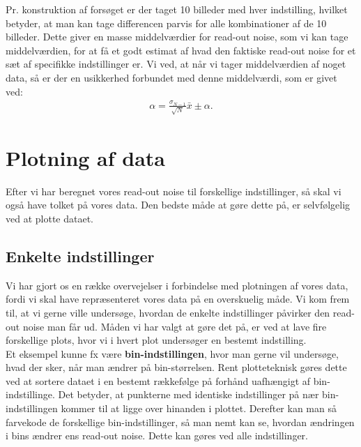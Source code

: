 \documentclass[working]{tuftebook}
\begin{document}
Pr. konstruktion af forsøget er der taget 10 billeder med hver indstilling, hvilket betyder, at man kan tage differencen parvis for alle kombinationer af de 10 billeder. Dette giver en masse middelværdier for read-out noise, som vi kan tage middelværdien, for at få et godt estimat af hvad den faktiske read-out noise for et sæt af specifikke indstillinger er. Vi ved, at når vi tager middelværdien af noget data, så er der en usikkerhed forbundet med denne middelværdi, som er givet ved:
\begin{align*}
\alpha = \frac{\sigma_{N-1}}{\sqrt{N}}
\bar{x}\pm \alpha
.\end{align*}
\section{Plotning af data}
Efter vi har beregnet vores read-out noise til forskellige indstillinger, så skal vi også have tolket på vores data. Den bedste måde at gøre dette på, er selvfølgelig ved at plotte dataet. 
\\
\subsection{Enkelte indstillinger}
Vi har gjort os en række overvejelser i forbindelse med plotningen af vores data, fordi vi skal have repræsenteret vores data på en overskuelig måde. Vi kom frem til, at vi gerne ville undersøge, hvordan de enkelte indstillinger påvirker den read-out noise man får ud. Måden vi har valgt at gøre det på, er ved at lave fire forskellige plots, hvor vi i hvert plot undersøger en bestemt indstilling. 
\\
Et eksempel kunne fx være \textbf{bin-indstillingen}, hvor man gerne vil undersøge, hvad der sker, når man ændrer på bin-størrelsen. Rent plotteteknisk gøres dette ved at sortere dataet i en bestemt rækkefølge på forhånd uafhængigt af bin-indstillinge. Det betyder, at punkterne med identiske indstillinger på nær bin-indstillingen kommer til at ligge over hinanden i plottet. Derefter kan man så farvekode de forskellige bin-indstillinger, så man nemt kan se, hvordan ændringen i bins ændrer ens read-out noise. Dette kan gøres ved alle indstillinger.
\end{document}
